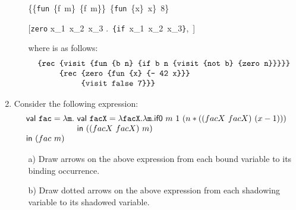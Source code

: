 \begin{enumerate}
\begin{itemize}
\hspace*{-5em}
\derive {\hspace*{\textwidth}}
{\emptyset\vdash \{\{\texttt{fun}\ \{f\ m\}\ \{f\ m\}\}\
\{\texttt{fun}\ \{x\}\ x\}\ 8\} \Rightarrow~~~~~~~~}

\hspace*{-5em}
\derive
{\hspace*{\textwidth}}
{[\texttt{zero} \mapsto \langle 
\lambda x_1\ x_2\ x_3 .\ 
\texttt{\{if}\ x_1\ x_2\ x_3\texttt{\}},\
\emptyset\rangle] \vdash {}
\Rightarrow~~~~~~~~
}

\bigskip
where  is as follows:
\[
\begin{array}{l}
\texttt{\{rec \{visit \{fun \{b\ n\} \{if b n \{visit \{not b\} \{zero n\}\}\}\}\}}\\
\texttt{\phantom{\{rec }\{rec \{zero \{fun \{x\} \{- 42 x\}\}\}}\\
\texttt{\phantom{\{rec \{rec }\{visit false 7\}\}\}}
\end{array}
\]

\end{itemize}

\item Consider the following expression:
\[
\begin{array}{l@{~}l}
\textsf{val}\ \code{fac} = \lambda \code{m}. &
\textsf{val}\ \code{facX} = \lambda \code{facX}.
\lambda \code{m}. \textsf{if0}\ m\ 1\ (n * ((\term{facX}\ \term{facX})\ (x - 1)))\\
&\textsf{in}\ ((\term{facX}\ \term{facX})\ m)\\
\textsf{in}\ (\term{fac}\ m)
\end{array}
\]

\begin{itemize}
\item[a)] Draw arrows on the above expression from each bound variable to its binding occurrence.
\item[b)] Draw dotted arrows on the above expression from each shadowing variable to its shadowed variable.
\end{itemize}


\end{enumerate}
